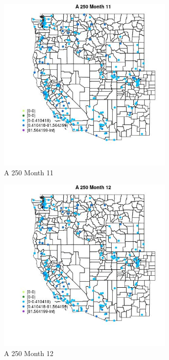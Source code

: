 \begin{figure} 
\centering  
\includegraphics[width=0.77\textwidth]{Code_Outputs/Report_ML_input_PM25_Step4_part_e_de_duplicated_aveswNAs_MapObsMo11A_250.jpg} 
\caption{\label{fig:Report_ML_input_PM25_Step4_part_e_de_duplicated_aveswNAsMapObsMo11A_250}A 250 Month 11} 
\end{figure} 
 

\clearpage 

\begin{figure} 
\centering  
\includegraphics[width=0.77\textwidth]{Code_Outputs/Report_ML_input_PM25_Step4_part_e_de_duplicated_aveswNAs_MapObsMo12A_250.jpg} 
\caption{\label{fig:Report_ML_input_PM25_Step4_part_e_de_duplicated_aveswNAsMapObsMo12A_250}A 250 Month 12} 
\end{figure} 
 

